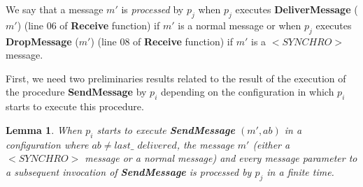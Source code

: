 \documentclass[11pt]{article}
\newtheorem{lemma}{Lemma}
\begin{document}
We say that a message $m'$ is \emph{processed} by $p_j$ when $p_j$ executes \textbf{DeliverMessage} ($m'$) (line 06 of \textbf{Receive} function) if $m'$ is a normal message or when $p_j$ executes \textbf{DropMessage} ($m'$) (line 08 of \textbf{Receive} function) if $m'$ is a $<SYNCHRO>$ message.

First, we need two preliminaries results related to the result of the execution of the procedure \textbf{SendMessage} by $p_i$ depending on the configuration in which $p_i$ starts to execute this procedure.

\begin{lemma}\label{lem:firstabneqld}
When $p_i$ starts to execute \textbf{SendMessage} $(m',ab)$ in a configuration where $ab \neq last\_$ $delivered$, the message $m'$ (either a $<SYNCHRO>$ message or a normal message) and every message parameter to a subsequent invocation of \textbf{SendMessage} is processed by $p_j$ in a finite time.
\end{lemma}
\end{document}
